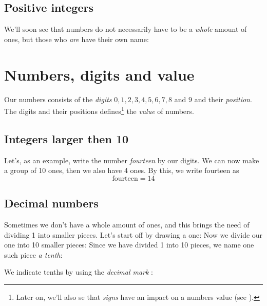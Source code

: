 \subsection*{Positive integers}
We'll soon see that numbers do not necessarily have to be a \textsl{whole} amount of ones, but those who \textsl{are} have their own name:\regv


\newpage
\section{Numbers, digits and value}
Our numbers consists of the \textit{digits} $ 0, 1, 2 , 3, 4, 5, 6, 7, 8 $ and $ 9 $ and their \textsl{position}. The digits and their positions defines\footnote{Later on, we'll also se that \textit{signs} have an impact on a numbers value  (see ).} the \textit{value}  of numbers.
\subsection*{Integers larger then 10}
Let's, as an example, write the number \textsl{fourteen} by our digits.
We can now make a group of 10 ones, then we also have 4 ones. By this, we write fourteen as
\[ \text{fourteen}=14 \]
\vsk

\newpage
\subsection*{Decimal numbers}
Sometimes we don't have a whole amount of ones, and this brings the need of dividing 1 into smaller pieces. Let's start off by drawing a one:
Now we divide our one into 10 smaller pieces:
Since we have divided 1 into 10 pieces, we name one such piece \textit{a tenth}:
\begin{comment}
\eks{\vs
	\fig{maal2}
	\fig{des2}
}\vsk
\end{comment}
We indicate tenths by using the \textit{decimal mark}   :
\regv
{}
\newpage
